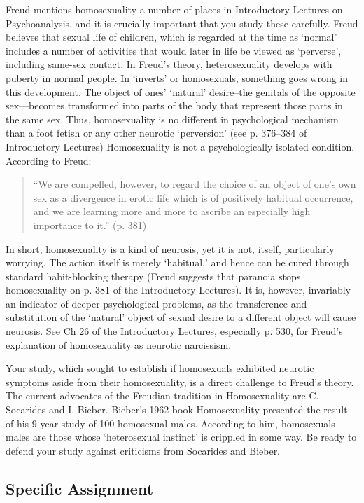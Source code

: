\begin{refsection}
Freud mentions homosexuality a number of places in Introductory Lectures on Psychoanalysis, and it is crucially important that you study these carefully. Freud believes that sexual life of children, which is regarded at the time as `normal' includes a number of activities that would later in life be viewed as `perverse', including same-sex contact. In Freud's theory, heterosexuality develops with puberty in normal people. In `inverts' or homosexuals, something goes wrong in this development. The object of ones' `natural' desire--the genitals of the opposite sex—becomes transformed into parts of the body that represent those parts in the same sex. Thus, homosexuality is no different in psychological mechanism than a foot fetish or any other neurotic `perversion' (see p. 376--384 of Introductory Lectures) Homosexuality is not a psychologically isolated condition. According to Freud:

\begin{quote}

“We are compelled, however, to regard the choice of an object of one's own sex as a divergence in erotic life which is of positively habitual occurrence, and we are learning more and more to ascribe an especially high importance to it.” (p. 381)
\end{quote}

In short, homosexuality is a kind of neurosis, yet it is not, itself, particularly worrying. The action itself is merely `habitual,' and hence can be cured through standard habit-blocking therapy (Freud suggests that paranoia stops homosexuality on p. 381 of the Introductory Lectures). It is, however, invariably an indicator of deeper psychological problems, as the transference and substitution of the `natural' object of sexual desire to a different object will cause neurosis. See Ch 26 of the Introductory Lectures, especially p. 530, for Freud's explanation of homosexuality as neurotic narcissism.

Your study, which sought to establish if homosexuals exhibited neurotic symptoms aside from their homosexuality, is a direct challenge to Freud's theory. The current advocates of the Freudian tradition in Homosexuality are C. Socarides and I. Bieber. Bieber's 1962 book Homosexuality presented the result of his 9-year study of 100 homosexual males. According to him, homosexuals males are those whose `heterosexual instinct' is crippled in some way. Be ready to defend your study against criticisms from Socarides and Bieber.

\subsection{Specific Assignment}
\label{specificassignment}


\end{refsection}
